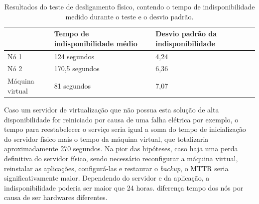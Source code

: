 

\begin{table}[h!]
\caption{Resultados do teste de desligamento físico, contendo o tempo de indisponibilidade medido durante o teste e o desvio padrão.}
\label{tab:teste1resultados}
\begin{center}
\begin{tabular}{|l|l|l|}\hline
 & \textbf{Tempo de indisponibilidade médio} & \textbf{Desvio padrão da indisponibilidade} \\\hline
Nó 1 & 124 segundos & 4,24 \\\hline
Nó 2 & 170,5 segundos & 6,36 \\\hline
Máquina virtual & 81 segundos & 7,07 \\\hline
\end{tabular}
\end{center}
\end{table}

Caso um servidor de virtualização que não possua esta solução de alta disponibilidade for reiniciado por causa de uma falha elétrica por exemplo,
o tempo para reestabelecer o serviço seria igual a soma do tempo de inicialização do servidor físico mais o tempo da máquina virtual, 
que totalizaria aproximadamente 270 segundos. 
Na pior das hipóteses, caso haja uma perda definitiva do servidor físico, sendo necessário reconfigurar a máquina virtual, reinstalar as aplicações,
configurá-las e restaurar o \textit{backup}, o \ac{MTTR} seria significativamente maior. Dependendo do servidor e da aplicação, 
a indisponibilidade poderia ser maior que 24 horas.
diferença tempo dos nós por causa de ser hardwares diferentes.


